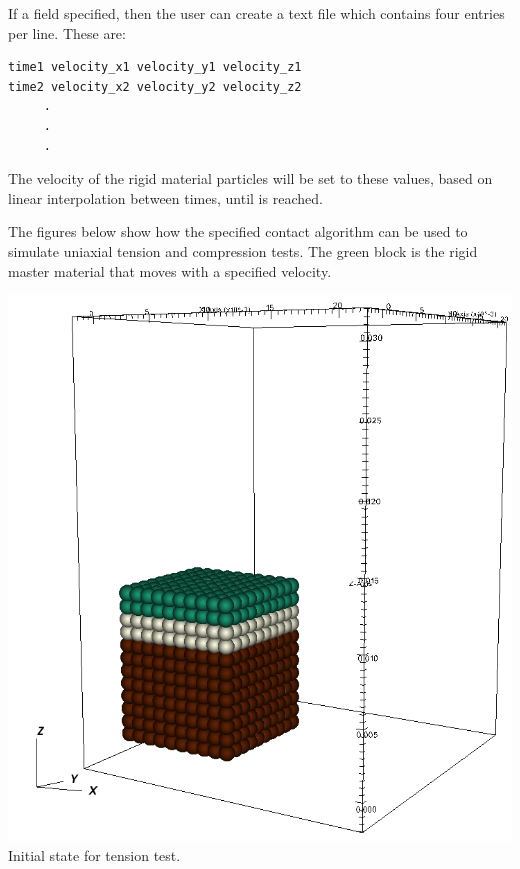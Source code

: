 If a  field  specified, then the user can
create a text file which contains four entries per line.  These are:
\begin{lstlisting}[backgroundcolor=\color{background}]
time1 velocity_x1 velocity_y1 velocity_z1
time2 velocity_x2 velocity_y2 velocity_z2
     .
     .
     .
\end{lstlisting}
The velocity of the rigid material particles will be set to these values,
based on linear interpolation between times, until 
is reached.  

The figures below show how the specified contact algorithm can be used to 
simulate uniaxial tension and compression tests.  The green block is the
rigid master material that moves with a specified velocity.

\begin{minipage}[t]{0.25\textwidth}
  \centering
  \includegraphics[width=0.9\columnwidth]{FIGS/contact/rigid_tension.png} \\
  {Initial state for tension test.}
\end{minipage}
